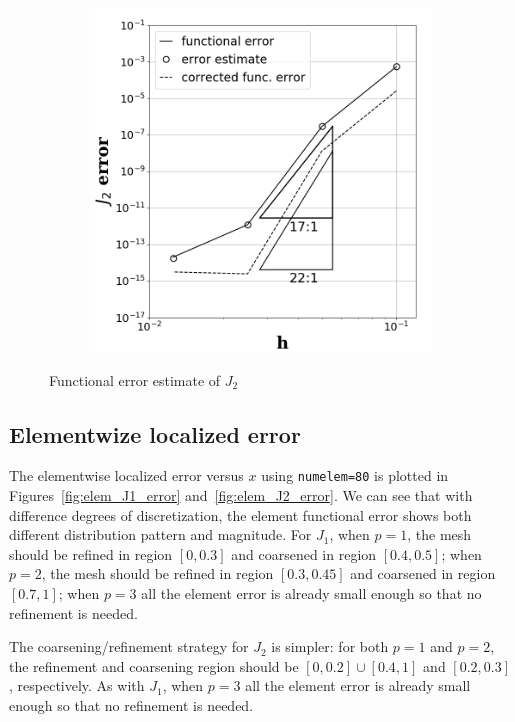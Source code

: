 \documentclass[a4paper]{article}
\begin{document}
\begin{figure}[!htbp]
\begin{subfigure}{0.45\textwidth}
    \label{fig:subsonic_p2_j2}
  \end{subfigure}
  \begin{subfigure}{0.45\textwidth}
    \centering
    \includegraphics[width=1.0\linewidth]{figures/subsonic_p3_J2.png}
    \label{fig:subsonic_p3_j2}
  \end{subfigure}
  \caption{Functional error estimate of $J_2$}
  \label{fig:func_error_J2}
\end{figure}

\subsection{Elementwize localized error}
The elementwise localized error versus $x$ using \texttt{numelem=80} is plotted in Figures~\ref{fig:elem_J1_error} and~\ref{fig:elem_J2_error}. We can see that with difference degrees of discretization, the element functional error shows both different distribution pattern and magnitude. For $J_1$, when $p=1$, the mesh should be refined in region $[0, 0.3]$ and coarsened in region $[0.4, 0.5]$; when $p=2$, the mesh should be refined in region $[0.3,0.45]$ and coarsened in region $[0.7, 1]$; when $p=3$ all the element error is already small enough so that no refinement is needed.

The coarsening/refinement strategy for $J_2$ is simpler: for both $p=1$ and $p=2$, the refinement and coarsening region should be $[0, 0.2] \cup [0.4, 1]$ and $[0.2, 0.3]$, respectively. As with $J_1$, when $p=3$ all the element error is already small enough so that no refinement is needed.
\end{document}
